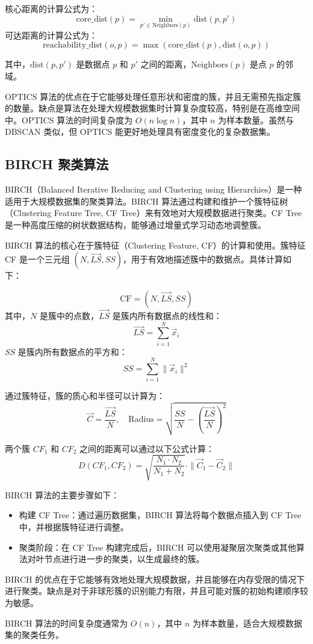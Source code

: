 \documentclass{ctexart} %
\begin{document}
核心距离的计算公式为：
\[
\text{core\_dist}(p) = \min_{p' \in \text{Neighbors}(p)} \text{dist}(p, p')
\]
可达距离的计算公式为：
\[
\text{reachability\_dist}(o, p) = \max(\text{core\_dist}(p), \text{dist}(o, p))
\]

其中，\(\text{dist}(p, p')\) 是数据点 \(p\) 和 \(p'\) 之间的距离，\(\text{Neighbors}(p)\) 是点 \(p\) 的邻域。

OPTICS 算法的优点在于它能够处理任意形状和密度的簇，并且无需预先指定簇的数量。缺点是算法在处理大规模数据集时计算复杂度较高，特别是在高维空间中。OPTICS 算法的时间复杂度为 \(O(n \log n)\)，其中 \(n\) 为样本数量。虽然与 DBSCAN 类似，但 OPTICS 能更好地处理具有密度变化的复杂数据集。

\subsection{BIRCH 聚类算法}

BIRCH（Balanced Iterative Reducing and Clustering using Hierarchies）是一种适用于大规模数据集的聚类算法。BIRCH 算法通过构建和维护一个簇特征树（Clustering Feature Tree, CF Tree）来有效地对大规模数据进行聚类。CF Tree 是一种高度压缩的树状数据结构，能够通过增量式学习动态地调整簇。

BIRCH 算法的核心在于簇特征（Clustering Feature, CF）的计算和使用。簇特征 CF 是一个三元组 \((N, \vec{LS}, SS)\)，用于有效地描述簇中的数据点。具体计算如下：

\[
\text{CF} = (N, \vec{LS}, SS)
\]
其中，\(N\) 是簇中的点数，\(\vec{LS}\) 是簇内所有数据点的线性和：
\[
\vec{LS} = \sum_{i=1}^{N} \vec{x}_i
\]
\(SS\) 是簇内所有数据点的平方和：
\[
SS = \sum_{i=1}^{N} \|\vec{x}_i\|^2
\]

通过簇特征，簇的质心和半径可以计算为：
\[
\vec{C} = \frac{\vec{LS}}{N}, \quad \text{Radius} = \sqrt{\frac{SS}{N} - \left(\frac{\vec{LS}}{N}\right)^2}
\]

两个簇 \(CF_1\) 和 \(CF_2\) 之间的距离可以通过以下公式计算：
\[
D(CF_1, CF_2) = \sqrt{\frac{N_1 \cdot N_2}{N_1 + N_2}} \cdot \|\vec{C}_1 - \vec{C}_2\|
\]

BIRCH 算法的主要步骤如下：
\begin{itemize}
    \item 构建 CF Tree：通过遍历数据集，BIRCH 算法将每个数据点插入到 CF Tree 中，并根据簇特征进行调整。
    \item 聚类阶段：在 CF Tree 构建完成后，BIRCH 可以使用凝聚层次聚类或其他算法对叶节点进行进一步的聚类，以生成最终的簇。
\end{itemize}

BIRCH 的优点在于它能够有效地处理大规模数据，并且能够在内存受限的情况下进行聚类。缺点是对于非球形簇的识别能力有限，并且可能对簇的初始构建顺序较为敏感。

BIRCH 算法的时间复杂度通常为 \(O(n)\)，其中 \(n\) 为样本数量，适合大规模数据集的聚类任务。
\end{document}
